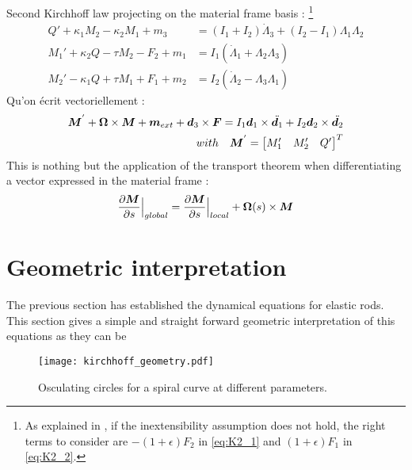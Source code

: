 Second Kirchhoff law projecting on the material frame basis : \footnote{As explained in \cite[p. 18]{Dill1992}, if the inextensibility assumption does not hold, the right terms to consider are $-(1+\epsilon)F_2$ in \cref{eq:K2_1} and $(1+\epsilon)F_1$ in \cref{eq:K2_2}.}
\begin{subequations}
	\begin{align}
		Q' + \kappa_1 M_2 - \kappa_2 M_1 + m_3 &= (I_1 + I_2)\dot{\Lambda}_3 + (I_2 - I_1)\Lambda_1\Lambda_2
		\label{eq:K2_2}\\
		M_1' + \kappa_2 Q - \tau M_2 - F_2 + m_1 &= I_1 (\dot{\Lambda}_1 + \Lambda_2 \Lambda_3)
		\label{eq:K2_1}\\
		M_2' - \kappa_1 Q + \tau M_1 + F_1 + m_2 &= I_2 (\dot{\Lambda}_2 - \Lambda_3 \Lambda_1)
		\label{eq:K2_2}
	\end{align}
\end{subequations}
Qu'on écrit vectoriellement : 
\begin{align}
	\boldsymbol{M}^{'} + \boldsymbol{\Omega} \times \boldsymbol{M} + \boldsymbol{m}_{ext} + \boldsymbol{d}_3 \times \boldsymbol{F} = I_1 \boldsymbol{d}_1 \times \ddot{\boldsymbol{d}_1} + I_2 \boldsymbol{d}_2 \times \ddot{\boldsymbol{d}_2} \\
	\quad with \quad
	\boldsymbol{M}^{'} = 
	\begin{bmatrix}M'_1 & M'_2 & Q'\end{bmatrix}^T
\end{align}
This is nothing but the application of the transport theorem when differentiating a vector expressed in the material frame : 
\begin{equation}
	\frac{\partial \boldsymbol{M}}{\partial s}\Bigr|_{global} = \frac{\partial \boldsymbol{M}}{\partial s}\Bigr|_{local} + \boldsymbol{\Omega}(s) \times \boldsymbol{M}
\end{equation}


\clearpage
\makebox[\textwidth]{} %
\newpage
\section{Geometric interpretation}

The previous section has established the dynamical equations for elastic rods. This section gives a simple and straight forward geometric interpretation of this equations as they can be 
 
\begin{figure}[h]
	\centering
	\texttt{[image: kirchhoff\_geometry.pdf]}
	\caption{Osculating circles for a spiral curve at different parameters.}
	\label{fig:5}
\end{figure} 

